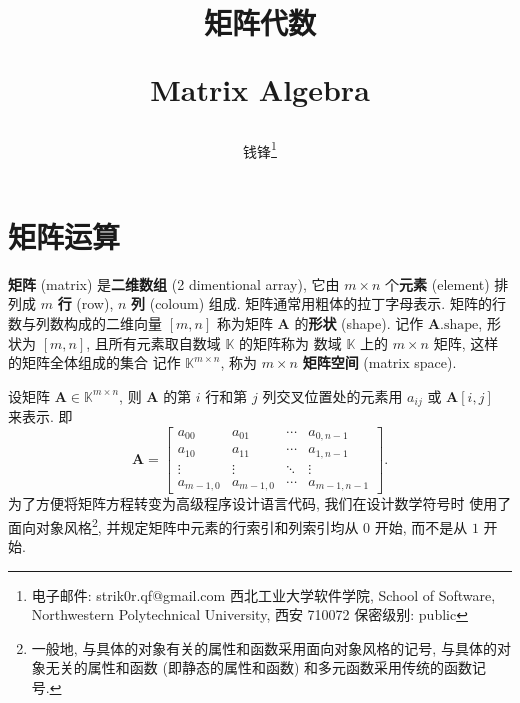 \documentclass[utf-8, 10pt]{article}
\begin{document}


\title{\textbf{矩阵代数}

Matrix Algebra}
\author{钱锋\thanks{电子邮件: strik0r.qf@gmail.com
\newline \indent 西北工业大学软件学院, School of Software, Northwestern Polytechnical University, 西安 710072
\newline \indent 保密级别: public}}
\setlength{\columnsep}{2em}
\saythanks

\section{矩阵运算}

\textbf{矩阵} (matrix) 是\textbf{二维数组} (2 dimentional array), 
它由 $m \times n$ 个\textbf{元素} (element) 排列成 $m$ \textbf{行} (row), 
$n$ \textbf{列} (coloum) 组成.
矩阵通常用粗体的拉丁字母表示.
矩阵的行数与列数构成的二维向量 $[m, n]$ 
称为矩阵 $\boldsymbol{A}$ 的\textbf{形状} (shape). 记作 $\boldsymbol{A}.\mathrm{shape}$,
形状为 $[m, n]$, 且所有元素取自数域 $\mathbb{K}$ 的矩阵称为
数域 $\mathbb{K}$ 上的 $m \times n$ 矩阵, 这样的矩阵全体组成的集合
记作 $\mathbb{K}^{m \times n}$, 称为 $m \times n$ \textbf{矩阵空间}
(matrix space).

设矩阵 $\boldsymbol{A} \in \mathbb{K}^{m \times n}$, 则 $\boldsymbol{A}$ 的第 $i$
行和第 $j$ 列交叉位置处的元素用 $a_{ij}$ 或 $\boldsymbol{A}[i,j]$ 来表示. 即
\[ \boldsymbol{A} = \begin{bmatrix}
    a_{00} & a_{01} & \cdots & a_{0, n-1} \\
    a_{10} & a_{11} & \cdots & a_{1, n-1} \\ 
    \vdots & \vdots & \ddots & \vdots \\ 
    a_{m-1, 0} & a_{m-1, 0} & \cdots & a_{m-1,n-1}
\end{bmatrix}. \]
为了方便将矩阵方程转变为高级程序设计语言代码, 我们在设计数学符号时
使用了面向对象风格\footnote{
    一般地, 与具体的对象有关的属性和函数采用面向对象风格的记号,
    与具体的对象无关的属性和函数 (即静态的属性和函数) 和多元函数采用传统的函数记号.
}, 并规定矩阵中元素的行索引和列索引均从 $0$ 开始, 而不是从
$1$ 开始.
\end{document}
